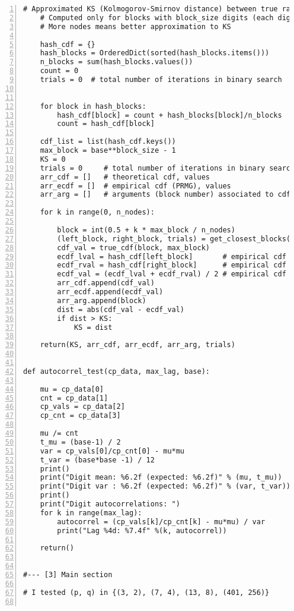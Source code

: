 \documentclass[oneside,10pt]{book}
\begin{document}
\begin{lstlisting}[numbers=left]
    # Approximated KS (Kolmogorov-Smirnov distance) between true random and PRNG
    # Computed only for blocks with block_size digits (each digit in base system)
    # More nodes means better approximation to KS

    hash_cdf = {}
    hash_blocks = OrderedDict(sorted(hash_blocks.items()))
    n_blocks = sum(hash_blocks.values())
    count = 0
    trials = 0  # total number of iterations in binary search


    for block in hash_blocks:
        hash_cdf[block] = count + hash_blocks[block]/n_blocks
        count = hash_cdf[block]

    cdf_list = list(hash_cdf.keys())
    max_block = base**block_size - 1
    KS = 0
    trials = 0     # total number of iterations in binary search
    arr_cdf = []   # theoretical cdf, values
    arr_ecdf = []  # empirical cdf (PRMG), values
    arr_arg = []   # arguments (block number) associated to cdf or ecdf

    for k in range(0, n_nodes): 

        block = int(0.5 + k * max_block / n_nodes)
        (left_block, right_block, trials) = get_closest_blocks(block, cdf_list, trials)
        cdf_val = true_cdf(block, max_block)
        ecdf_lval = hash_cdf[left_block]       # empirical cdf
        ecdf_rval = hash_cdf[right_block]      # empirical cdf
        ecdf_val = (ecdf_lval + ecdf_rval) / 2 # empirical cdf
        arr_cdf.append(cdf_val)
        arr_ecdf.append(ecdf_val)
        arr_arg.append(block)
        dist = abs(cdf_val - ecdf_val)
        if dist > KS:
            KS = dist

    return(KS, arr_cdf, arr_ecdf, arr_arg, trials) 


def autocorrel_test(cp_data, max_lag, base):

    mu = cp_data[0]
    cnt = cp_data[1]
    cp_vals = cp_data[2]
    cp_cnt = cp_data[3]

    mu /= cnt
    t_mu = (base-1) / 2
    var = cp_vals[0]/cp_cnt[0] - mu*mu
    t_var = (base*base -1) / 12 
    print()
    print("Digit mean: %6.2f (expected: %6.2f)" % (mu, t_mu))
    print("Digit var : %6.2f (expected: %6.2f)" % (var, t_var))
    print()
    print("Digit autocorrelations: ")
    for k in range(max_lag):
        autocorrel = (cp_vals[k]/cp_cnt[k] - mu*mu) / var
        print("Lag %4d: %7.4f" %(k, autocorrel))

    return()


#--- [3] Main section

# I tested (p, q) in {(3, 2), (7, 4), (13, 8), (401, 256)}


\end{lstlisting}
\end{document}
